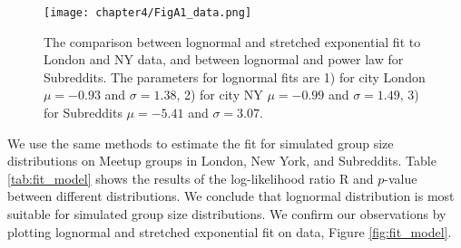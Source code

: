 \begin{figure}[ht]
	\centering
	\texttt{[image: chapter4/FigA1\_data.png]}
	\caption[The fitting of empirical group size distributions.]{The comparison between lognormal and stretched exponential fit to London and NY data,  and between lognormal and power law for Subreddits. The parameters for lognormal fits are 1) for city London $\mu=-0.93$ and $\sigma = 1.38$, 2) for city NY $\mu=-0.99$ and $\sigma = 1.49$, 3) for Subreddits $\mu=-5.41$ and $\sigma = 3.07$.  }
	\label{fig:fitdata}
\end{figure}

We use the same methods to estimate the fit for simulated group size distributions on Meetup groups in London, New York, and Subreddits. Table \ref{tab:fit_model} shows the results of the log-likelihood ratio R and $p$-value between different distributions. We conclude that lognormal distribution is most suitable for simulated group size distributions. We confirm our observations by plotting lognormal and stretched exponential fit on data, Figure \ref{fig:fit_model}.  
